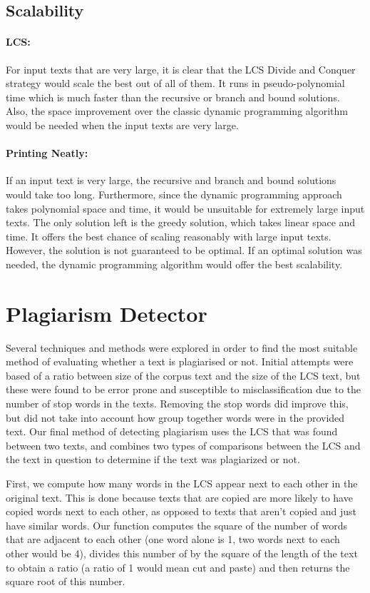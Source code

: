 \documentclass[a4paper,12pt]{article}
\begin{document}
		\subsection{Scalability}
			\paragraph{LCS:} For input texts that are very large, it is clear that the LCS Divide and Conquer strategy would scale the best out of all of them. It runs in pseudo-polynomial time which is much faster than the recursive or branch and bound solutions. Also, the space improvement over the classic dynamic programming algorithm would be needed when the input texts are very large.

			\paragraph{Printing Neatly:} If an input text is very large, the recursive and branch and bound solutions would take too long. Furthermore, since the dynamic programming approach takes polynomial space and time, it would be unsuitable for extremely large input texts. The only solution left is the greedy solution, which takes linear space and time. It offers the best chance of scaling reasonably with large input texts. However, the solution is not guaranteed to be optimal. If an optimal solution was needed, the dynamic programming algorithm would offer the best scalability.

	\section{Plagiarism Detector}
	
Several techniques and methods were explored in order to find the most suitable method of evaluating whether a text is plagiarised or not. Initial attempts were based of a ratio between size of the corpus text and the size of the LCS text, but these were found to be error prone and susceptible to misclassification due to the number of stop words in the texts. Removing the stop words did improve this, but did not take into account how group together words were in the provided text. Our final method of detecting plagiarism uses the LCS that was found between two texts, and combines two types of comparisons between the LCS and the text in question to determine if the text was plagiarized or not.

First, we compute how many words in the LCS appear next to each other in the original text. This is done 
because texts that are copied are more likely to have copied words next to each other, as opposed to texts 
that aren't copied and just have similar words. Our function computes the square of the number of words 
that are adjacent to each other (one word alone is 1, two words next to each other would be 4), divides this 
number of by the square of the length of the text to obtain a ratio (a ratio of 1 would mean cut and paste)
and then returns the square root of this number.
\end{document}
